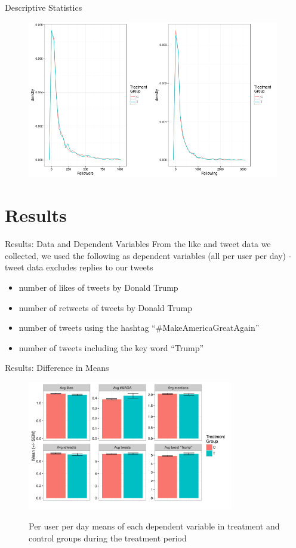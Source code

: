 \documentclass[10pt]{beamer}\usepackage[]{graphicx}\usepackage[]{color}
\begin{document}
\begin{frame}{Descriptive Statistics}

\begin{figure}
\includegraphics[width=11cm]{../plots/hists.png}
\end{figure}

\end{frame}


\section{Results}
\begin{frame}{Results: Data and Dependent Variables}
From the like and tweet data we collected, we used the following as dependent variables (all per user per day) - tweet data excludes replies to our tweets

\begin{itemize}
\item number of likes of tweets by Donald Trump
\item number of retweets of tweets by Donald Trump
\item number of tweets using the hashtag ``\#MakeAmericaGreatAgain''
\item number of tweets including the key word ``Trump''
\end{itemize} 
\end{frame}


\begin{frame}{Results: Difference in Means}

\begin{figure}
\includegraphics[width=9cm]{../plots/mean_bars.png}
\label{fig:mean_bars}
\caption{Per user per day means of each dependent variable in treatment and control groups during the treatment period}
\end{figure}

\end{frame}
\end{document}
